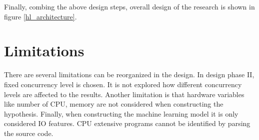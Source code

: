 Finally, combing the above design steps, overall design of the research is shown in figure \ref{hl_architecture}.

\section{Limitations}

There are several limitations can be reorganized in  the design. In design phase II, fixed concurrency level is chosen. It is not explored how different concurrency levels are affected to the results. Another limitation is that  hardware variables like number of CPU, memory are not considered when constructing the hypothesis. Finally, when constructing the machine learning model it is only considered IO features. CPU extensive programs cannot be identified by parsing the source code.

